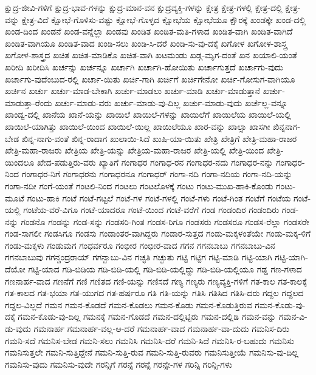 {ಕ್ಷುದ್ರ-ಜೀವಿ-ಗಳಿಗೆ
ಕ್ಷುದ್ರ-ಭಾವ-ಗಳನ್ನು
ಕ್ಷುದ್ರ-ಮಾನ-ವನ
ಕ್ಷುದ್ರವ್ಯಕ್ತಿ-ಗಳನ್ನು
ಕ್ಷೇತ್ರ
ಕ್ಷೇತ್ರ-ಗಳಲ್ಲಿ
ಕ್ಷೇತ್ರ-ದಲ್ಲಿ
ಕ್ಷೇತ್ರ-ವನ್ನು
ಕ್ಷೇತ್ರ-ವಿದೆ
ಕ್ಷೋಭೆ-ಗೊಳಿಸು-ವಷ್ಟು
ಕ್ಷೋಭೆ-ಗೊಳ್ಳದ
ಕ್ಷೋಭೆಯ
ಕ್ಷೋಭೆಯೂ
ಕ್ಷೌರಕ್ಕೆ
ಖಂಡಕ್ಕೇ
ಖಂಡ-ದಲ್ಲಿ
ಖಂಡ-ದಿಂದ
ಖಂಡನೆ
ಖಂಡ-ವನ್ನೆಲ್ಲಾ
ಖಂಡವು
ಖಂಡಿತ
ಖಂಡಿತ-ಮತಿ-ಗಳಾದ
ಖಂಡಿತ-ವಾಗಿ
ಖಂಡಿತ-ವಾಗಿದೆ
ಖಂಡಿತ-ವಾಗಿಯೂ
ಖಂಡಿತ-ವಾದ
ಖಂಡಿ-ಸಲು
ಖಂಡಿ-ಸಿ-ದರೆ
ಖಂಡಿ-ಸು-ವು-ದಕ್ಕೆ
ಖಗೋಳ
ಖಗೋಳ-ಶಾಸ್ತ್ರ
ಖಗೋಳ-ಶಾಸ್ತ್ರದ
ಖಚಿತ
ಖಚಿತ-ಮಾಡಿಕೊ
ಖಚಿತ-ವಾಗಿ
ಖಟಮಂಡು
ಖಡ್ಗ-ಮೃಗ-ದಂತೆ
ಖನ
ಖಯಾಲಿ-ಯಂತೆ
ಖರೀದಿ
ಖರೀದಿಸಿ
ಖರ್ಚನ್ನು
ಖರ್ಚನ್ನೂ
ಖರ್ಚಾಗಿ
ಖರ್ಚಾಗಿ-ಹೋಯಿತು
ಖರ್ಚಾಗುತ್ತದೆ
ಖರ್ಚಾಗು-ವುದು
ಖರ್ಚಾಗು-ವುದೆಂಬುದ-ರಲ್ಲಿ
ಖರ್ಚಾ-ಯಿತು
ಖರ್ಚಿ-ಗಾಗಿ
ಖರ್ಚಿಗೆ
ಖರ್ಚಿಗೇನೋ
ಖರ್ಚಿ-ಗೋಸುಗ-ವಾಗಿಯೂ
ಖರ್ಚಿನ
ಖರ್ಚು
ಖರ್ಚು-ಮಾಡ-ಬೇಕಾಗಿ
ಖರ್ಚು-ಮಾಡಲು
ಖರ್ಚು-ಮಾಡಿ
ಖರ್ಚು-ಮಾಡುತ್ತಾನೆ
ಖರ್ಚು-ಮಾಡುತ್ತಾ-ರೆಂದು
ಖರ್ಚು-ಮಾಡು-ವರು
ಖರ್ಚು-ಮಾಡು-ವು-ದಿಲ್ಲ
ಖರ್ಚು-ಮಾಡು-ವುದು
ಖರ್ಚೆಲ್ಲ-ವನ್ನೂ
ಖಾಂಡ್ವ-ದಲ್ಲಿ
ಖಾನೆಯ
ಖಾನೆ-ಯನ್ನು
ಖಾಯಿಲೆ
ಖಾಯಿಲೆ-ಗಳನ್ನು
ಖಾಯಿಲೆಗೆ
ಖಾಯಿಲೆಯ
ಖಾಯಿಲೆ-ಯಲ್ಲಿ
ಖಾಯಿಲೆ-ಯಾಗಿತ್ತು
ಖಾಯಿಲೆ-ಯಿಂದ
ಖಾಯಿಲೆ-ಯಿಲ್ಲ
ಖಾಯಿಲೆಯೂ
ಖಾರ-ವನ್ನು
ಖಾಲ್ಸಾ
ಖಾಸಗೀ
ಖಿನ್ನನಾಗ-ಬೇಡ
ಖಿನ್ನ-ನಾಗು-ವಂತೆ
ಖಿನ್ನ-ರಾದಾಗ
ಖುಲಾಯಿ-ಸಿದೆ
ಖುಷಿ-ಯಾ-ಯಿತು
ಖೇತ್ರಿ
ಖೇತ್ರಿಗೆ
ಖೇತ್ರಿ-ಮಹಾ-ರಾಜರ
ಖೇತ್ರಿ-ಮಹಾ-ರಾಜರು
ಖೇತ್ರಿಯ
ಖೇತ್ರಿ-ಯನ್ನು
ಖೇತ್ರಿಯ-ಮಹಾ-ರಾಜರ
ಖೇತ್ರಿ-ಯಲ್ಲಿ
ಖೇತ್ರಿ-ಯಿಂದ
ಖೇತ್ರಿ-ಯಿಂದಲೂ
ಖೇದ-ಪಡುತ್ತಿರು-ವರು
ಖ್ಯಾತಿಗೆ
ಗಂಗಾಧರ
ಗಂಗಾಧ-ರನ
ಗಂಗಾಧರ-ನದು
ಗಂಗಾಧರ-ನನ್ನು
ಗಂಗಾಧರ-ನಿಂದ
ಗಂಗಾಧರ-ನಿಗೆ
ಗಂಗಾಧರನು
ಗಂಗಾಧರನೂ
ಗಂಗಾಧರ್
ಗಂಗಾ-ನದಿ
ಗಂಗಾ-ನದಿಯ
ಗಂಗಾ-ನದಿ-ಯನ್ನು
ಗಂಗಾ-ನದೀ
ಗಂಗೆ-ಯಂತೆ
ಗಂಟಲಿ-ನಿಂದ
ಗಂಟಲು
ಗಂಟಲೊಳಕ್ಕೆ
ಗಂಟು
ಗಂಟು-ಮುಖ-ಹಾಕಿ-ಕೊಂಡು
ಗಂಟು-ಮೂಟೆ
ಗಂಟು-ಹಾಕಿ
ಗಂಟೆ
ಗಂಟೆ-ಗಟ್ಟಲೆ
ಗಂಟೆ-ಗಳ
ಗಂಟೆ-ಗಳಲ್ಲಿ
ಗಂಟೆ-ಗಳು
ಗಂಟೆ-ಗಿಂತ
ಗಂಟೆಗೆ
ಗಂಟೆಯ
ಗಂಟೆ-ಯಲ್ಲಿ
ಗಂಟೆಯ-ವರೆ-ವಿಗೂ
ಗಂಟೆ-ಯಾದರೂ
ಗಂಟೆ-ಯಿಂದ
ಗಂಟೆ-ವರೆಗೆ
ಗಂಡ
ಗಂಡಂದಿರ
ಗಂಡಂದಿರು
ಗಂಡ-ನನ್ನು
ಗಂಡನೊ
ಗಂಡನ್ನು
ಗಂಡ-ಸನ್ನು
ಗಂಡಸರಿ-ಗಿಂತ
ಗಂಡಸ-ರಿಗೂ
ಗಂಡಸರು
ಗಂಡಸರೂ
ಗಂಡಸ-ರೆಲ್ಲಾ
ಗಂಡಸರೇ
ಗಂಡ-ಸಾಗಲೀ
ಗಂಡಸಿಗೂ
ಗಂಡಸು
ಗಂಡಾಂತರ-ವಾಗಿದ್ದರು
ಗಂಡಾರ-ಸುತ್ತದ
ಗಂಡು-ಮಕ್ಕಳಂತೆಯೇ
ಗಂಡು-ಮಕ್ಕ-ಳಿಗೆ
ಗಂಡು-ಮಕ್ಕಳು
ಗಂಡುಮಗ
ಗಂಧರ್ವರೂ
ಗಂಭೀರ
ಗಂಭೀರ-ವಾದ
ಗಗನ
ಗಗನಬಾಬು
ಗಗನಬಾಬು-ವಿನ
ಗಗನಬಾಬುವು
ಗಗನ್ಚಂದ್ರರಾಯ್
ಗಗನ್ಬಾಬು-ವಿನ
ಗಚ್ಛತಿ
ಗಚ್ಛುತು
ಗಟ್ಟಿ
ಗಟ್ಟಿಗ
ಗಟ್ಟಿ-ಮಾಡಿ
ಗಟ್ಟಿ-ಯಾಗಿ
ಗಟ್ಟಿ-ಯಾಗಿ-ದೆಯೋ
ಗಟ್ಟಿ-ಯಾದ
ಗಡಿ-ಬಿಡಿಯ
ಗಡಿ-ಬಿಡಿ-ಯಲ್ಲಿ
ಗಡಿ-ಬಿಡಿ-ಯಲ್ಲಿದ್ದು
ಗಡಿ-ಬಿಡಿ-ಯಲ್ಲಿಯೂ
ಗಡ್ಡ
ಗಣ-ಗಳಾದ
ಗಣನಾರ್ಹ-ವಾದ
ಗಣನೆಗೆ
ಗಣಿ
ಗಣಿತದ
ಗಣಿ-ಯನ್ನು
ಗಣಿಸದೆ
ಗಣ್ಯ
ಗಣ್ಯರು
ಗಣ್ಯವ್ಯಕ್ತಿ-ಗಳಿಗೆ
ಗತ-ಕಾಲ
ಗತ-ಕಾಲಕ್ಕೆ
ಗತ-ಕಾಲದ
ಗತ-ಭಯಾ
ಗತ-ಯುಗದ
ಗತ-ಹರ್ಷರೂ
ಗತಿ
ಗತಿ-ಯನ್ನು
ಗತಿಸಿ
ಗತಿಸಿದ
ಗತಿಸಿ-ದರು
ಗದ್ದಲ
ಗದ್ದಲದ
ಗದ್ದಲ-ವಿಲ್ಲದೆ
ಗಮನ
ಗಮನ-ಕೊಡದೆ
ಗಮನ-ಕೊಡಲು
ಗಮನ-ಕೊಡು
ಗಮನ-ಕೊಡುತ್ತಿರುವ
ಗಮನ-ಕೊಡು-ವು-ದಕ್ಕೆ
ಗಮನ-ಕೊಡು-ವು-ದಿಲ್ಲ
ಗಮನಕ್ಕೆ
ಗಮನ-ಗೊಡದೆ
ಗಮನ-ದಲ್ಲಿಟ್ಟಿರು
ಗಮನ-ದಲ್ಲಿಡಿ
ಗಮನ-ವನ್ನು
ಗಮನ-ವಿ-ಡು-ವುದು
ಗಮನಾರ್ಹ
ಗಮನಾರ್ಹ-ವಲ್ಲ-ಆ-ದರೆ
ಗಮನಾರ್ಹ-ವಾದ
ಗಮನಾರ್ಹ-ವಾ-ದುದು
ಗಮನಿಸ-ದಿರು
ಗಮನಿ-ಸದೆ
ಗಮನಿಸ-ಬೇಡ
ಗಮನಿ-ಸಲು
ಗಮನಿಸಿ
ಗಮನಿಸಿ-ದರೆ
ಗಮನಿ-ಸಿದೆ
ಗಮನಿಸಿ-ರ-ಬಹುದು
ಗಮನಿಸು
ಗಮನಿಸುತ್ತಲೇ
ಗಮನಿ-ಸುತ್ತಿದ್ದೇನೆ
ಗಮನಿ-ಸುತ್ತಿ-ರುವ
ಗಮನಿ-ಸುತ್ತಿ-ರುವರು
ಗಮನಿಸುತ್ತೀಯೆ
ಗಮನಿಸು-ವು-ದಿಲ್ಲ
ಗಮನಿಸು-ವುದು
ಗಮನಿಸು-ವುದೇ
ಗರನ್ಸಿಗೆ
ಗರನ್ಸೆ
ಗರನ್ಸೆ
ಗರನ್ಸೇ-ಗಳ
ಗರಿನ್ಸಿ
ಗರಿನ್ಸಿ-ಗಳು
}
